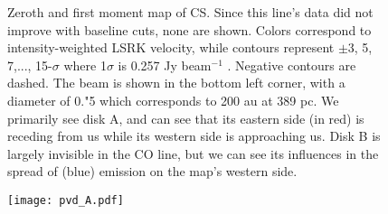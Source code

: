 \begin{figure}[h]
  \hspace*{\fill}%
  \vfill%
  \hspace*{\fill}%
  \caption{Zeroth and first moment map of CS. Since this line's data did not improve with baseline cuts, none are shown. Colors correspond to intensity-weighted LSRK velocity, while contours represent $\pm$3, 5, 7,..., 15-$\sigma$ where 1$\sigma$ is 0.257 Jy beam$^{-1}$ \kms. Negative contours are dashed. The beam is shown in the bottom left corner, with a diameter of 0."5 which corresponds to 200 au at 389 pc. We primarily see disk A, and can see that its eastern side (in red) is receding from us while its western side is approaching us. Disk B is largely invisible in the CO line, but we can see its influences in the spread of (blue) emission on the map's western side.}
  \label{fig:cs_moments}
\end{figure}





\begin{figure}
  \centering
  \texttt{[image: pvd\_A.pdf]}
    \label{fig:pv_diag}
\end{figure}







